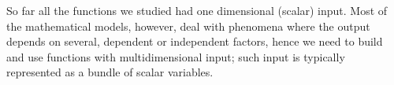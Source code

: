 So far all the functions we studied had one
dimensional (scalar) input. Most of the mathematical
models, however, deal with phenomena where the output
depends on several, dependent or independent factors,
hence we need to build and use
functions with multidimensional input; such input is
typically represented as a bundle of scalar variables.